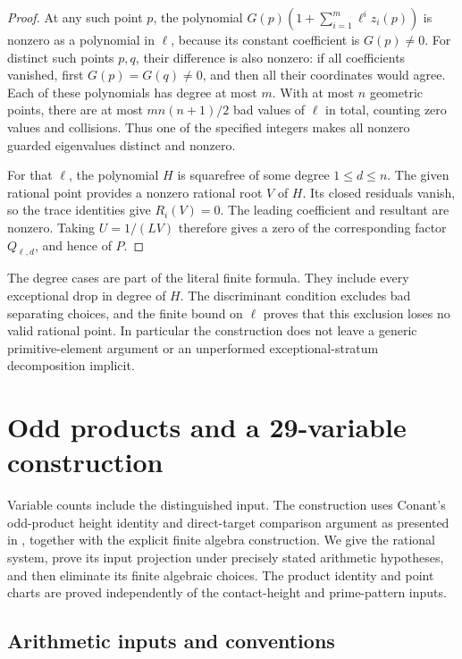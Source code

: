 \documentclass[11pt,a4paper]{article}
\theoremstyle{definition}
\theoremstyle{remark}
\begin{document}
\begin{proof}
At any such point $p$, the polynomial
$G(p)(1+\sum_{i=1}^m\ell^i z_i(p))$ is nonzero as a polynomial
in $\ell$, because its constant coefficient is $G(p)\ne0$.
For distinct such points $p,q$, their difference is also nonzero:
if all coefficients vanished, first $G(p)=G(q)\ne0$, and then
all their coordinates would agree. Each of these polynomials has
degree at most $m$. With at most $n$ geometric points, there are
at most $m n(n+1)/2$ bad values of $\ell$ in total, counting zero
values and collisions. Thus one of the specified integers makes
all nonzero guarded eigenvalues distinct and nonzero.

For that $\ell$, the polynomial $H$ is squarefree of some degree
$1\le d\le n$. The given rational point provides a nonzero
rational root $V$ of $H$. Its closed residuals vanish, so the trace
identities give $R_i(V)=0$. The leading coefficient and resultant
are nonzero. Taking $U=1/(LV)$ therefore gives a zero of the
corresponding factor $Q_{\ell,d}$, and hence of $P$.
\end{proof}

The degree cases are part of the literal finite formula. They include
every exceptional drop in degree of $H$. The discriminant condition
excludes bad separating choices, and the finite bound on $\ell$ proves
that this exclusion loses no valid rational point. In particular the
construction does not leave a generic primitive-element argument or an
unperformed exceptional-stratum decomposition implicit.


\section{Odd products and a 29-variable construction}
\label{sec:u29}

Variable counts include the distinguished input.  The construction uses
Conant's odd-product height identity and direct-target comparison argument
as presented in \cite[Lemma \nolinkurl{v9:lem:product} and
Lemma \nolinkurl{lem:v9-bridge}]{RepositoryV9}, together with the explicit
finite algebra construction.  We give the rational system, prove its
input projection under precisely stated arithmetic hypotheses, and then
eliminate its finite algebraic choices.  The product identity and point
charts are proved independently of the contact-height and prime-pattern
inputs.

\subsection{Arithmetic inputs and conventions}
\end{document}

